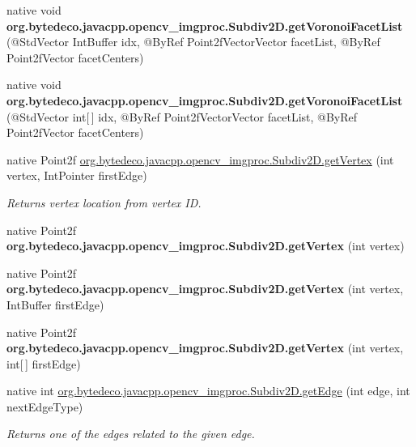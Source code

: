 \begin{DoxyCompactItemize}
\mbox{\label{group__imgproc_gaff0d60b428566a0c11806ee9d5c37aa7}} 
native void {\bfseries org.\+bytedeco.\+javacpp.\+opencv\+\_\+imgproc.\+Subdiv2\+D.\+get\+Voronoi\+Facet\+List} (@Std\+Vector Int\+Buffer idx, @By\+Ref Point2f\+Vector\+Vector facet\+List, @By\+Ref Point2f\+Vector facet\+Centers)
\item 
\mbox{\label{group__imgproc_ga0b28e3fc4285948f3de2eadb5c55fb9c}} 
native void {\bfseries org.\+bytedeco.\+javacpp.\+opencv\+\_\+imgproc.\+Subdiv2\+D.\+get\+Voronoi\+Facet\+List} (@Std\+Vector int\mbox{[}$\,$\mbox{]} idx, @By\+Ref Point2f\+Vector\+Vector facet\+List, @By\+Ref Point2f\+Vector facet\+Centers)
\item 
native Point2f \hyperlink{group__imgproc_gaf2a77c9870a51b9b26eb2eff3e77b97e}{org.\+bytedeco.\+javacpp.\+opencv\+\_\+imgproc.\+Subdiv2\+D.\+get\+Vertex} (int vertex, Int\+Pointer first\+Edge)
\begin{DoxyCompactList}\small\item\em Returns vertex location from vertex ID. \end{DoxyCompactList}\item 
\mbox{\label{group__imgproc_gab8b524a58702870ec3a745bc8eb22ee8}} 
native Point2f {\bfseries org.\+bytedeco.\+javacpp.\+opencv\+\_\+imgproc.\+Subdiv2\+D.\+get\+Vertex} (int vertex)
\item 
\mbox{\label{group__imgproc_ga902f0d947039fa5e4c0beaab4fa5bfdf}} 
native Point2f {\bfseries org.\+bytedeco.\+javacpp.\+opencv\+\_\+imgproc.\+Subdiv2\+D.\+get\+Vertex} (int vertex, Int\+Buffer first\+Edge)
\item 
\mbox{\label{group__imgproc_ga5e9a148db6fdc98cb1e33ec4a0b6546c}} 
native Point2f {\bfseries org.\+bytedeco.\+javacpp.\+opencv\+\_\+imgproc.\+Subdiv2\+D.\+get\+Vertex} (int vertex, int\mbox{[}$\,$\mbox{]} first\+Edge)
\item 
native int \hyperlink{group__imgproc_ga18f65f307c0cb3c2a8d5b851ab025d51}{org.\+bytedeco.\+javacpp.\+opencv\+\_\+imgproc.\+Subdiv2\+D.\+get\+Edge} (int edge, int next\+Edge\+Type)
\begin{DoxyCompactList}\small\item\em Returns one of the edges related to the given edge. \end{DoxyCompactList}\item 

\end{DoxyCompactItemize}
